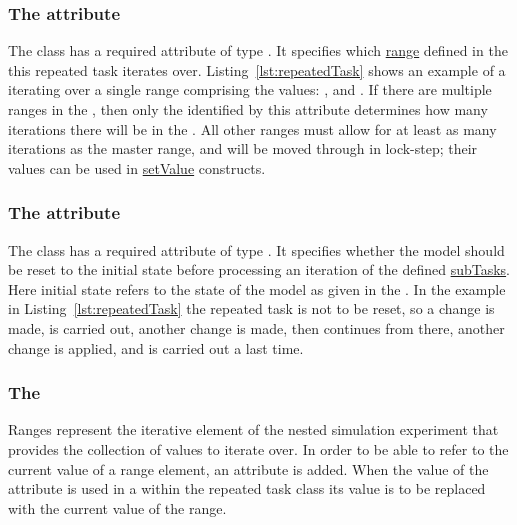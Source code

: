 \subsubsection{The  attribute}
\label{sec:rangeAttribute}
The  class has a required attribute  of type .
It specifies which \hyperref[sec:ranges]{range} defined in the  this repeated task iterates over.
Listing~\ref{lst:repeatedTask} shows an example of a  iterating over a single range comprising the values: ,  and .
If there are multiple ranges in the , then only the  identified by this attribute determines how many iterations there will be in the .
All other ranges must allow for at least as many iterations as the master range, and will be moved through in lock-step; their values can be used in \hyperref[class:setValue]{setValue} constructs.


\subsubsection{The  attribute}
\label{sec:resetModel}
The  class has a required attribute  of type . It specifies whether the model should be reset to the initial state before processing an iteration of the defined \hyperref[class:subTask]{subTasks}. Here initial state refers to the state of the model as given in the .  In the example in  Listing~\ref{lst:repeatedTask} the repeated task is not to be reset, so a change is made,  is carried out, another change is made, then  continues from there, another change is applied, and  is carried out a last time.


\subsubsection{The }
\label{sec:ranges}
Ranges represent the iterative element of the nested simulation experiment that provides the collection of values to iterate over. In order to be able to refer to the current value of a range element, an  attribute is added. When the value of the  attribute is used in a  within the repeated task class its value is to be replaced with the current value of the range.

